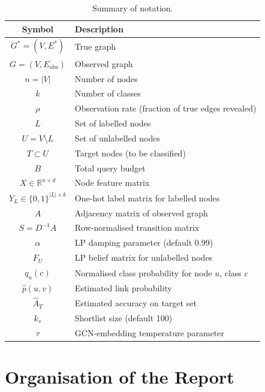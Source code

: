 \documentclass[12pt,a4paper,oneside]{report}
\begin{document}
\begin{table}[htbp]
\centering
\caption{Summary of notation.}
\label{tab:notation}
\small
\begin{tabular}{cl}
\toprule
Symbol & Description \\
\midrule
$G^* = (V, E^*)$ & True graph \\
$G = (V, E_{\text{obs}})$ & Observed graph \\
$n = |V|$ & Number of nodes \\
$k$ & Number of classes \\
$\rho$ & Observation rate (fraction of true edges revealed) \\
$L$ & Set of labelled nodes \\
$U = V \setminus L$ & Set of unlabelled nodes \\
$T \subset U$ & Target nodes (to be classified) \\
$B$ & Total query budget \\
$X \in \mathbb{R}^{n \times d}$ & Node feature matrix \\
$Y_L \in \{0,1\}^{|L| \times k}$ & One-hot label matrix for labelled nodes \\
$A$ & Adjacency matrix of observed graph \\
$S = D^{-1}A$ & Row-normalised transition matrix \\
$\alpha$ & LP damping parameter (default 0.99) \\
$F_U$ & LP belief matrix for unlabelled nodes \\
$q_u(c)$ & Normalised class probability for node $u$, class $c$ \\
$\hat{p}(u,v)$ & Estimated link probability \\
$\hat{A}_T$ & Estimated accuracy on target set \\
$k_s$ & Shortlist size (default 100) \\
$\tau$ & GCN-embedding temperature parameter \\
\bottomrule
\end{tabular}
\end{table}

\section{Organisation of the Report}
\end{document}
